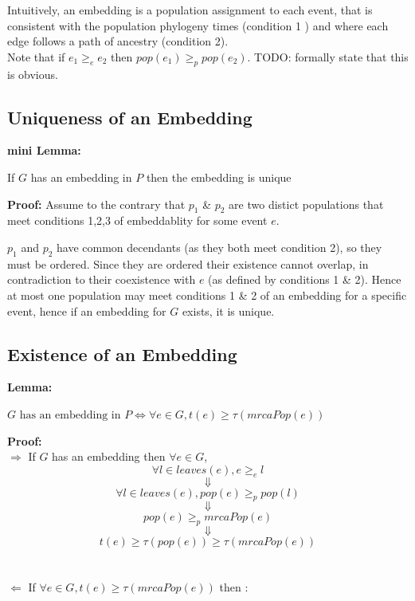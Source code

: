 \documentclass[11pt]{article}
\newcommand{\1}{\mathbbm{1}}
\begin{document}
Intuitively, an embedding is a population assignment to each event, that is consistent with the population phylogeny times (condition 1 ) and where each edge follows a path of ancestry (condition 2).\\

Note that if $e_1 \geq_e e_2$ then $pop(e_1) \geq_p pop(e_2)$. TODO: formally state that this is obvious.


\subsection{Uniqueness of an Embedding}
\textbf{mini Lemma:}
\begin{center}
If $G$ has an embedding in $P$ then the embedding is unique\end{center}
\textbf{Proof:} Assume to the contrary that $p_1$ \& $p_2$ are two distict populations that meet conditions 1,2,3 of embeddablity for some event $e$.

$p_1$ and $p_2$ have common decendants (as they both meet condition 2), so they must be ordered. Since they are ordered their existence cannot overlap, in contradiction to their coexistence with $e$ (as defined by conditions 1 \& 2). Hence at most one population may meet conditions 1 \& 2 of an embedding for a specific event, hence if an embedding for $G$ exists, it is unique.


\subsection{Existence of an Embedding}
\textbf{Lemma:}
\begin{center}$G \text{ has an embedding in } P \Leftrightarrow \forall e \in G, t(e) \geq \tau(mrcaPop(e))$\end{center}
\textbf{Proof:}\\

$\Rightarrow$ If $G$ has an embedding then $ \forall e \in G$, \[\forall l \in leaves(e), e \geq_e l \] \[\Downarrow\] \[\forall l \in leaves(e), pop(e) \geq_p pop(l )\] \[\Downarrow\] \[pop(e) \geq_p mrcaPop(e)\] \[\Downarrow\] \[t(e) \geq \tau(pop(e)) \geq \tau(mrcaPop(e))\]
\\
\\

$\Leftarrow$ If $ \forall e \in G, t(e) \geq \tau(mrcaPop(e))$ then :\\
\end{document}
